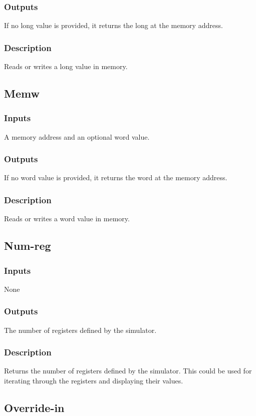 \documentclass[10pt, openany]{book}
\begin{document}
\subsubsection{Outputs}
If no long value is provided, it returns the long at the memory address.
\subsubsection{Description}
Reads or writes a long value in memory.

\subsection{Memw}
\subsubsection{Inputs}
A memory address and an optional word value.
\subsubsection{Outputs}
If no word value is provided, it returns the word at the memory address.
\subsubsection{Description}
Reads or writes a word value in memory.

\subsection{Num-reg}
\subsubsection{Inputs}
None
\subsubsection{Outputs}
The number of registers defined by the simulator.
\subsubsection{Description}
Returns the number of registers defined by the simulator.  This could be used for iterating through the registers and displaying their values.

\subsection{Override-in}
\end{document}
